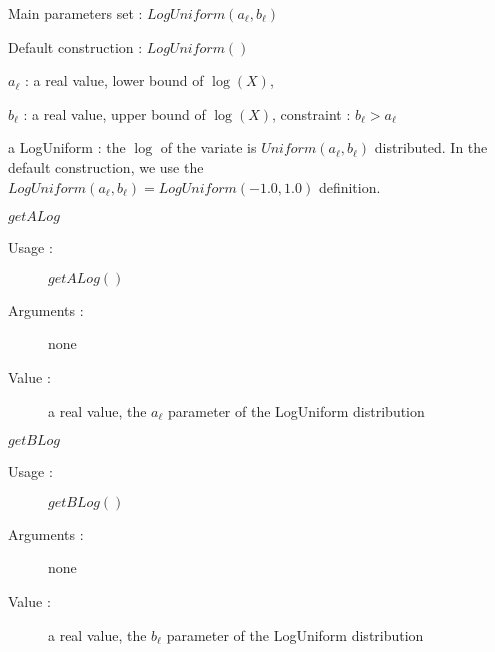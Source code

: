\begin{description}

\item[Usage :] \rule{0pt}{1em}
  \begin{description}
  \item Main parameters set : $LogUniform(a_\ell ,b_\ell)$
  \item Default construction : $LogUniform( )$
  \end{description}

\item[Arguments :]  \rule{0pt}{1em}
  \begin{description}
  \item $a_\ell$ : a real value, lower bound of $\log(X)$,
  \item $b_\ell$ : a real value, upper bound of $\log(X)$, constraint : $b_\ell>a_\ell$
  \end{description}

\item[Value :] a LogUniform : the $\log$ of the variate is $Uniform(a_\ell ,b_\ell)$ distributed. In the default construction, we use the $LogUniform(a_\ell, b_\ell) = LogUniform(-1.0, 1.0)$ definition.

\item[Some methods :] \rule{0pt}{1em}
  \begin{description}
  \item $getALog$
    \begin{description}
    \item[Usage :] $getALog()$
    \item[Arguments :] none
    \item[Value :]  a real value,  the $a_\ell$ parameter of the LogUniform distribution
    \end{description}
    \bigskip
  \item $getBLog$
    \begin{description}
    \item[Usage :] $getBLog()$
    \item[Arguments :] none
    \item[Value :]  a real value,  the $b_\ell$ parameter of the LogUniform distribution
    \end{description}
    \bigskip


\end{description}
\end{description}
